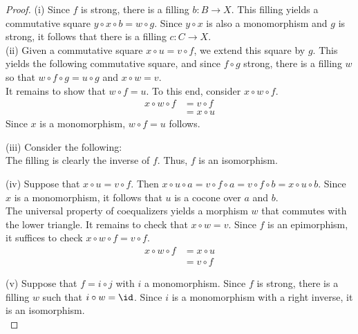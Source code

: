 \documentclass{amsart}
\begin{document}
\begin{proof}
  (i) Since $f$ is strong, there is a filling $b : B \to X$.
  This filling yields a commutative square $y \circ x \circ b = w \circ g$.
  Since $y \circ x$ is also a monomorphism and $g$ is strong, it follows that there is a filling $c : C \to X$.
  \[\]
  (ii) Given a commutative square $x \circ u = v \circ f$, we extend this square by $g$.
  This yields the following commutative square, and since $f \circ g$ strong, there is a filling $w$ so that $w \circ f \circ g = u \circ g$ and $x \circ w = v$.
  \[\]
  It remains to show that $w \circ f = u$.
  To this end, consider $x \circ w \circ f$.
  \begin{align}
    x \circ w \circ f &= v \circ f\\
                      &= x \circ u
  \end{align}
  Since $x$ is a monomorphism, $w \circ f = u$ follows.

  (iii) Consider the following:
  \[\]
  The filling is clearly the inverse of $f$.
  Thus, $f$ is an isomorphism.

  (iv) Suppose that $x \circ u = v \circ f$.
  Then $x \circ u \circ a = v \circ f \circ a = v \circ f \circ b = x \circ u \circ b$.
  Since $x$ is a monomorphism, it follows that $u$ is a cocone over $a$ and $b$.
  \[\]
  The universal property of coequalizers yields a morphism $w$ that commutes with the lower triangle.
  It remains to check that $x \circ w = v$.
  Since $f$ is an epimorphism, it suffices to check $x \circ w \circ f = v \circ f$.
  \begin{align}
    x \circ w \circ f &= x \circ u\\
                      &= v \circ f
  \end{align}

  (v) Suppose that $f = i \circ j$ with $i$ a monomorphism.
  Since $f$ is strong, there is a filling $w$ such that $i \circ w = \id$.
  Since $i$ is a monomorphism with a right inverse, it is an isomorphism.
  \[\]
\end{proof}
\end{document}
